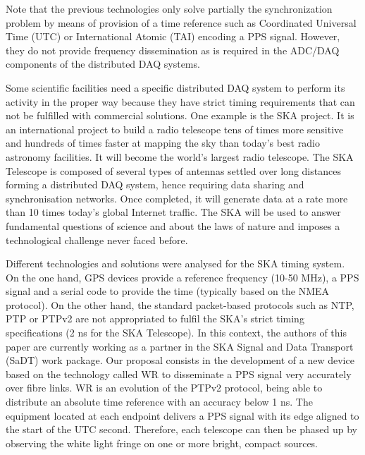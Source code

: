Note that the previous technologies only solve partially the synchronization problem by means of provision of a time reference such as Coordinated Universal Time (UTC) or International Atomic (TAI) encoding a PPS signal. However, they do not provide frequency dissemination as is required in the ADC/DAQ components of the distributed DAQ systems.

Some scientific facilities need a specific distributed DAQ system to perform its activity in the proper way because they have strict timing requirements that can not be fulfilled with commercial solutions. One example is the SKA \cite{ska:project_website} project. It is an international project to build a radio telescope tens of times more sensitive and hundreds of times faster at mapping the sky than today's best radio astronomy facilities. It will become the world's largest radio telescope. The SKA Telescope is composed of several types of antennas settled over long distances forming a distributed DAQ system, hence requiring  data sharing and synchronisation networks. Once completed, it will generate data at a rate more than 10 times today's global Internet traffic. The SKA will be used to answer fundamental questions of science and about the laws of nature and imposes a technological challenge never faced before.

Different technologies and solutions were analysed for the SKA timing system. On the one hand, GPS devices provide a reference frequency (10-50 MHz), a PPS signal and a serial code to provide the time (typically based on the NMEA protocol). On the other hand, the standard packet-based protocols such as NTP, PTP or PTPv2 are not appropriated to fulfil the SKA's strict timing specifications (2 ns for the SKA Telescope).
In this context, the authors of this paper are currently working as a partner in the SKA Signal and Data Transport (SaDT) \cite{ska:sadt_website} work package. Our proposal consists in the development of a new device based on the technology called WR \cite{ohwr:wr_wiki} to disseminate a PPS signal very accurately over fibre links. WR is an evolution of the PTPv2 protocol, being able to distribute an absolute time reference with an accuracy below 1 ns. The equipment located at each endpoint delivers a PPS signal with its edge aligned to the start of the UTC second. Therefore, each telescope can then be phased up by observing the white light fringe on one or more bright, compact sources.

